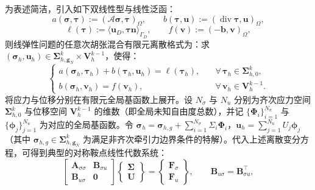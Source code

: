 为表述简洁，引入如下双线性型与线性泛函：
\[
a(\boldsymbol{\sigma},\boldsymbol{\tau}):=(\mathcal{A}\boldsymbol{\sigma},\boldsymbol{\tau})_{\Omega},\qquad b(\boldsymbol{\tau},\boldsymbol{u}):=(\operatorname{div}\boldsymbol{\tau},\boldsymbol{u})_{\Omega},
\]
\[
\ell(\boldsymbol{\tau}):=\langle \boldsymbol{u}_D,\boldsymbol{\tau}\boldsymbol{n}\rangle_{\Gamma_D},\qquad f(\boldsymbol{v}):=(-\boldsymbol{b},\boldsymbol{v})_{\Omega}, 
\]
则线弹性问题的任意次胡张混合有限元离散格式为：求 $(\boldsymbol{\sigma}_h,\boldsymbol{u}_h)\in \boldsymbol{\Sigma}_{h,\boldsymbol{g}_N}^k\times \boldsymbol{V}_h^{k-1}$，使得：
\begin{equation} \label{eq:ch5_hz_discrete_weak_form}
	\begin{cases}
		a(\boldsymbol{\sigma}_h,\boldsymbol{\tau}_h)+b(\boldsymbol{\tau}_h,\boldsymbol{u}_h)=\ell(\boldsymbol{\tau}_h), &\quad \forall\,\boldsymbol{\tau}_h\in\boldsymbol{\Sigma}_{h,0}^k,\\[0.4em] 
		b(\boldsymbol{\sigma}_h,\boldsymbol{v}_h) = f(\boldsymbol{v}_h), &\quad \forall\,\boldsymbol{v}_h\in \boldsymbol{V}_h^{k-1}. 
	\end{cases}
\end{equation}
将应力与位移分别在有限元全局基函数上展开。设 $N_\sigma$ 与 $N_u$ 分别为齐次应力空间 $\boldsymbol{\Sigma}_{h,0}^k$ 与位移空间 $\boldsymbol{V}_h^{k-1}$ 的维数（即全局未知自由度总数），并记 $\{\boldsymbol{\Phi}_i\}_{i=1}^{N_\sigma}$ 与 $\{\boldsymbol{\phi}_j\}_{j=1}^{N_u}$ 为对应的全局基函数。令 $\boldsymbol{\sigma}_h = \boldsymbol{\sigma}_{h,g} + \sum_{i=1}^{N_\sigma}\Sigma_i\boldsymbol{\Phi}_i$，$\boldsymbol{u}_h=\sum_{j=1}^{N_u}U_j\boldsymbol{\phi}_j$（其中 $\boldsymbol{\sigma}_{h,g} \in \boldsymbol{\Sigma}_{h,\boldsymbol{g}_N}^k$ 为满足非齐次牵引力边界条件的特解）。代入上述离散变分方程，可得到典型的对称鞍点线性代数系统：
\begin{equation} \label{eq:ch5_saddle_point_system}
	\begin{bmatrix} 
		\boldsymbol{A}_{\sigma\sigma} & \boldsymbol{B}_{\sigma u}\\ \boldsymbol{B}_{u\sigma} & \boldsymbol{0} 
	\end{bmatrix} 
	\begin{Bmatrix} 
		\boldsymbol{\Sigma}\\ \boldsymbol{U} 
	\end{Bmatrix} = 
	\begin{Bmatrix} 
		\boldsymbol{F}_{\sigma}\\ \boldsymbol{F}_{u} 
	\end{Bmatrix}, 
	\qquad \boldsymbol{B}_{u\sigma}=\boldsymbol{B}_{\sigma u}^{\top},
\end{equation}
